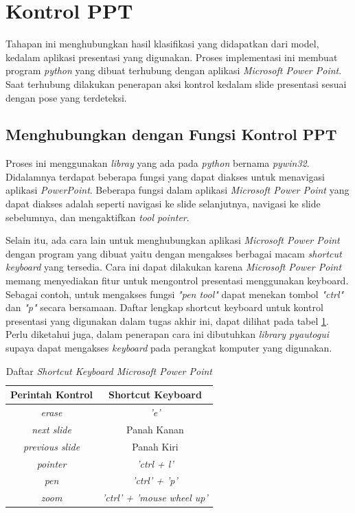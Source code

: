 \section{Kontrol PPT}
\label{kontrolppt}

Tahapan ini menghubungkan hasil klasifikasi yang didapatkan dari model, kedalam aplikasi presentasi yang digunakan. Proses implementasi ini membuat program \emph{python} yang dibuat terhubung dengan aplikasi \emph{Microsoft Power Point}. Saat terhubung dilakukan penerapan aksi kontrol kedalam slide presentasi sesuai dengan pose yang terdeteksi.

\subsection{Menghubungkan dengan Fungsi Kontrol PPT}
\label{Menghubungkan dengan Fungsi Kontrol PPT}

Proses ini menggunakan \emph{libray} yang ada pada \emph{python} bernama \emph{pywin32}. Didalamnya terdapat beberapa fungsi yang dapat diakses untuk menavigasi aplikasi \emph{PowerPoint}. Beberapa fungsi dalam aplikasi \emph{Microsoft Power Point} yang dapat diakses adalah seperti navigasi ke slide selanjutnya, navigasi ke slide sebelumnya, dan mengaktifkan \emph{tool pointer}. 

Selain itu, ada cara lain untuk menghubungkan aplikasi \emph{Microsoft Power Point} dengan program yang dibuat yaitu dengan mengakses berbagai macam \emph{shortcut keyboard} yang tersedia. Cara ini dapat dilakukan karena \emph{Microsoft Power Point} memang menyediakan fitur untuk mengontrol presentasi menggunakan keyboard. Sebagai contoh, untuk mengakses fungsi \emph{"pen tool"} dapat menekan tombol \emph{"ctrl"} dan \emph{"p"} secara bersamaan. Daftar lengkap shortcut keyboard untuk kontrol presentasi yang digunakan dalam tugas akhir ini, dapat dilihat pada tabel \ref{tb: daftarshortcutkeyboardmicrosoftpowerpoint}. Perlu diketahui juga, dalam penerapan cara ini dibutuhkan \emph{library pyautogui} supaya dapat mengakses \emph{keyboard} pada perangkat komputer yang digunakan. 

\begin{longtable}{|c|c|}
  \caption{Daftar \emph{Shortcut Keyboard Microsoft Power Point}}
  \label{tb: daftarshortcutkeyboardmicrosoftpowerpoint}\\
  \hline
  \textbf{Perintah Kontrol} & \textbf{Shortcut Keyboard} \\
  \hline
  \emph{erase}   & \emph{'e'}  \\
  \emph{next slide}   & Panah Kanan  \\
  \emph{previous slide}   & Panah Kiri  \\
  \emph{pointer}   & \emph{'ctrl + l'}  \\
  \emph{pen}   & \emph{'ctrl' + 'p'}  \\
  \emph{zoom}   & \emph{'ctrl' + 'mouse wheel up'}  \\
  \hline
\end{longtable}

